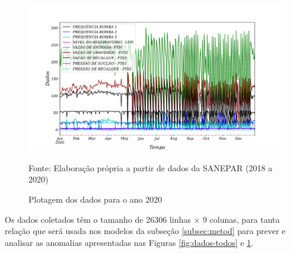 \begin{figure}[H]
	\centering
	\caption{Plotagem dos dados para o ano 2020}
	\label{fig:2020-a-frente}
	\includegraphics[width=1\linewidth]{"Introducao/Figuras/2020 a frente"}
	
	Fonte: Elaboração própria a partir de dados da SANEPAR (2018 a 2020)
\end{figure}

Os dados coletados têm o tamanho de 26306 linhas × 9 colunas, para tanta relação que será usada nos modelos da subseção \ref{subsec:metod} para prever e analisar as anomalias apresentadas nas Figuras \ref{fig:dados-todos} e \ref{fig:2020-a-frente}.







